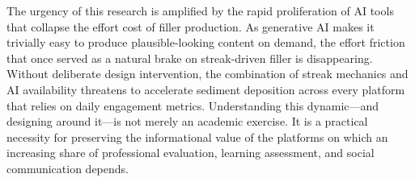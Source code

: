 \documentclass[12pt]{article}
\begin{document}
The urgency of this research is amplified by the rapid proliferation of AI tools that collapse the effort cost of filler production. As generative AI makes it trivially easy to produce plausible-looking content on demand, the effort friction that once served as a natural brake on streak-driven filler is disappearing. Without deliberate design intervention, the combination of streak mechanics and AI availability threatens to accelerate sediment deposition across every platform that relies on daily engagement metrics. Understanding this dynamic---and designing around it---is not merely an academic exercise. It is a practical necessity for preserving the informational value of the platforms on which an increasing share of professional evaluation, learning assessment, and social communication depends.



\end{document}
